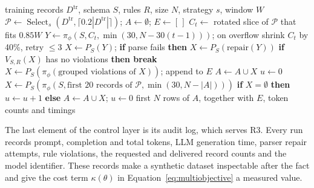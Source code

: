 \documentclass[conference]{IEEEtran}
\begin{document}
\begin{algorithm}[t]
\caption{Generation loop of the control layer}
\label{alg:loop}
\small
\begin{algorithmic}[1]
\Require training records $D^{\mathrm{tr}}$, schema $S$, rules $R$, size $N$, strategy $s$, window $W$
\State $\mathcal{P}\gets\operatorname{Select}_s(D^{\mathrm{tr}},\lceil0.2|D^{\mathrm{tr}}|\rceil)$; $A\gets\emptyset$; $E\gets[\,]$
  \State $C_t\gets$ rotated slice of $\mathcal{P}$ that fits $0.85W$ 
  \State $Y\gets\pi_\phi(S,C_t,\min(30,N-30(t-1)))$; on overflow shrink $C_t$ by 40\%, retry $\le3$
  \State $X\gets P_S(Y)$; \textbf{if} parse fails \textbf{then} $X\gets P_S(\text{repair}(Y))$
   
    \State \textbf{if} $V_{S,R}(X)$ has no violations \textbf{then break}
    \State $X\gets P_S(\pi_\phi(\text{grouped violations of }X))$; append to $E$
  \EndFor
  \State $A\gets A\cup X$
\EndFor
\State $u\gets0$
 
  \State $X\gets P_S(\pi_\phi(S,\text{first 20 records of }\mathcal{P},\min(30,N-|A|)))$
  \State \textbf{if} $X=\emptyset$ \textbf{then} $u\gets u+1$ \textbf{else} $A\gets A\cup X$; $u\gets0$
\EndWhile
\State \Return first $N$ rows of $A$, together with $E$, token counts and timings
\end{algorithmic}
\end{algorithm}

The last element of the control layer is its audit log, which serves R3. Every run records prompt, completion and total tokens, LLM generation time, parser repair attempts, rule violations, the requested and delivered record counts and the model identifier. These records make a synthetic dataset inspectable after the fact and give the cost term $\kappa(\theta)$ in Equation~\eqref{eq:multiobjective} a measured value.
\end{document}

